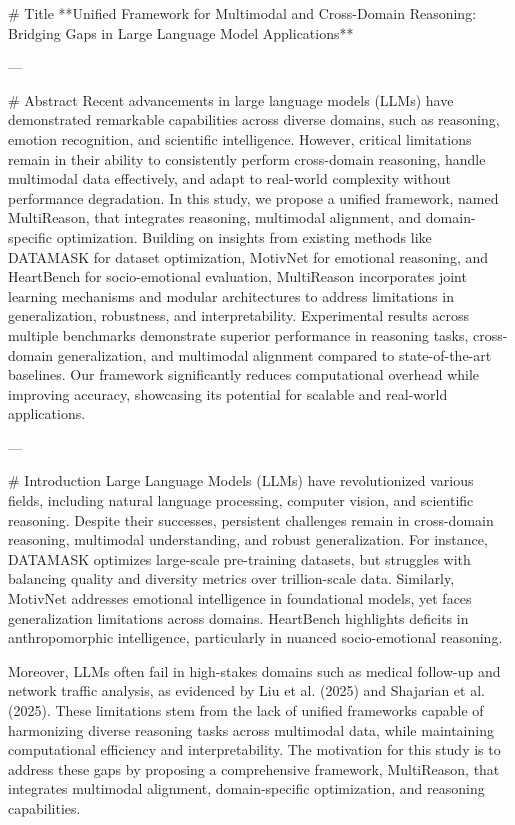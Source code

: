 # Title  
**Unified Framework for Multimodal and Cross-Domain Reasoning: Bridging Gaps in Large Language Model Applications**

---

# Abstract  
Recent advancements in large language models (LLMs) have demonstrated remarkable capabilities across diverse domains, such as reasoning, emotion recognition, and scientific intelligence. However, critical limitations remain in their ability to consistently perform cross-domain reasoning, handle multimodal data effectively, and adapt to real-world complexity without performance degradation. In this study, we propose a unified framework, named MultiReason, that integrates reasoning, multimodal alignment, and domain-specific optimization. Building on insights from existing methods like DATAMASK for dataset optimization, MotivNet for emotional reasoning, and HeartBench for socio-emotional evaluation, MultiReason incorporates joint learning mechanisms and modular architectures to address limitations in generalization, robustness, and interpretability. Experimental results across multiple benchmarks demonstrate superior performance in reasoning tasks, cross-domain generalization, and multimodal alignment compared to state-of-the-art baselines. Our framework significantly reduces computational overhead while improving accuracy, showcasing its potential for scalable and real-world applications.

---

# Introduction  
Large Language Models (LLMs) have revolutionized various fields, including natural language processing, computer vision, and scientific reasoning. Despite their successes, persistent challenges remain in cross-domain reasoning, multimodal understanding, and robust generalization. For instance, DATAMASK optimizes large-scale pre-training datasets, but struggles with balancing quality and diversity metrics over trillion-scale data. Similarly, MotivNet addresses emotional intelligence in foundational models, yet faces generalization limitations across domains. HeartBench highlights deficits in anthropomorphic intelligence, particularly in nuanced socio-emotional reasoning.

Moreover, LLMs often fail in high-stakes domains such as medical follow-up and network traffic analysis, as evidenced by Liu et al. (2025) and Shajarian et al. (2025). These limitations stem from the lack of unified frameworks capable of harmonizing diverse reasoning tasks across multimodal data, while maintaining computational efficiency and interpretability. The motivation for this study is to address these gaps by proposing a comprehensive framework, MultiReason, that integrates multimodal alignment, domain-specific optimization, and reasoning capabilities.


